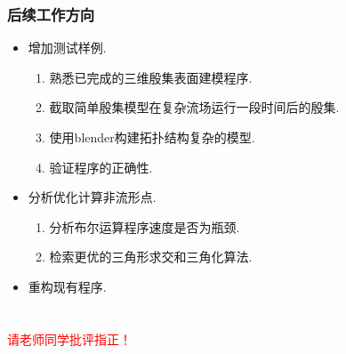 \documentclass[UTF8]{ctexbeamer}	%
\theoremstyle{plain}
\theoremstyle{definition}
\theoremstyle{remark}
\numberwithin{equation}{section}
\begin{document}
\begin{frame}
    \frametitle{后续工作方向}
    \begin{itemize}
        \item 增加测试样例.
        \begin{enumerate}
        \item 熟悉已完成的三维殷集表面建模程序.
        \item 截取简单殷集模型在复杂流场运行一段时间后的殷集.
        \item 使用blender构建拓扑结构复杂的模型.
        \item 验证程序的正确性.
    \end{enumerate}
    
    \item 分析优化计算非流形点.
    \begin{enumerate}
        \item 分析布尔运算程序速度是否为瓶颈.
        \item 检索更优的三角形求交和三角化算法.
    \end{enumerate}

    \item 重构现有程序.
    \end{itemize}
\end{frame}


\section*{}
\begin{frame}
    \centering\huge
    \textcolor{red}{请老师同学批评指正！}
\end{frame}
\end{document}
